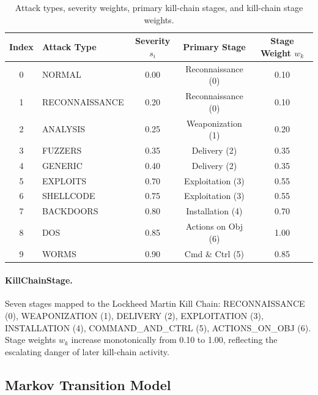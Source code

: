 \begin{table}[ht]
  \centering
  \caption{Attack types, severity weights, primary kill-chain stages,
           and kill-chain stage weights.}
  \label{tab:attack_severity_meth}
  \begin{tabular}{clccc}
    \toprule
    Index & Attack Type & Severity $s_i$ & Primary Stage & Stage Weight $w_k$ \\
    \midrule
    0 & NORMAL        & 0.00 & Reconnaissance (0) & 0.10 \\
    1 & RECONNAISSANCE & 0.20 & Reconnaissance (0) & 0.10 \\
    2 & ANALYSIS      & 0.25 & Weaponization (1)  & 0.20 \\
    3 & FUZZERS       & 0.35 & Delivery (2)       & 0.35 \\
    4 & GENERIC       & 0.40 & Delivery (2)       & 0.35 \\
    5 & EXPLOITS      & 0.70 & Exploitation (3)   & 0.55 \\
    6 & SHELLCODE     & 0.75 & Exploitation (3)   & 0.55 \\
    7 & BACKDOORS     & 0.80 & Installation (4)   & 0.70 \\
    8 & DOS           & 0.85 & Actions on Obj (6) & 1.00 \\
    9 & WORMS         & 0.90 & Cmd \& Ctrl (5)    & 0.85 \\
    \bottomrule
  \end{tabular}
\end{table}

\paragraph{KillChainStage.}
Seven stages mapped to the Lockheed Martin Kill Chain:
RECONNAISSANCE (0), WEAPONIZATION (1), DELIVERY (2), EXPLOITATION (3),
INSTALLATION (4), COMMAND\_AND\_CTRL (5), ACTIONS\_ON\_OBJ (6).
Stage weights $w_k$ increase monotonically from 0.10 to 1.00, reflecting
the escalating danger of later kill-chain activity.

\subsection{Markov Transition Model}
\label{sec:transition}

